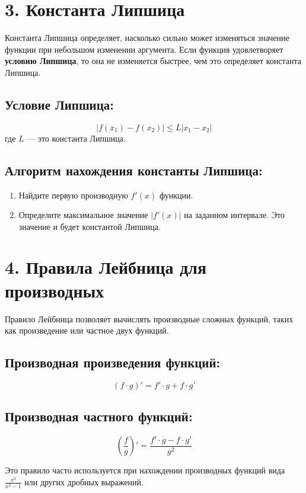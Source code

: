 \documentclass[a4paper,12pt]{article}
\begin{document}
\section*{3. Константа Липшица}

Константа Липшица определяет, насколько сильно может изменяться значение функции при небольшом изменении аргумента. Если функция удовлетворяет \textbf{условию Липшица}, то она не изменяется быстрее, чем это определяет константа Липшица.

\subsection*{Условие Липшица:}
\[
|f(x_1) - f(x_2)| \leq L |x_1 - x_2|
\]
где \( L \) — это константа Липшица.

\subsection*{Алгоритм нахождения константы Липшица:}
\begin{enumerate}
    \item Найдите первую производную \( f'(x) \) функции.
    \item Определите максимальное значение \( |f'(x)| \) на заданном интервале. Это значение и будет константой Липшица.
\end{enumerate}

\section*{4. Правила Лейбница для производных}

Правило Лейбница позволяет вычислять производные сложных функций, таких как произведение или частное двух функций.

\subsection*{Производная произведения функций:}
\[
(f \cdot g)' = f' \cdot g + f \cdot g'
\]

\subsection*{Производная частного функций:}
\[
\left( \frac{f}{g} \right)' = \frac{f' \cdot g - f \cdot g'}{g^2}
\]

Это правило часто используется при нахождении производных функций вида \( \frac{x^3}{x^2 - 1} \) или других дробных выражений.
\end{document}
